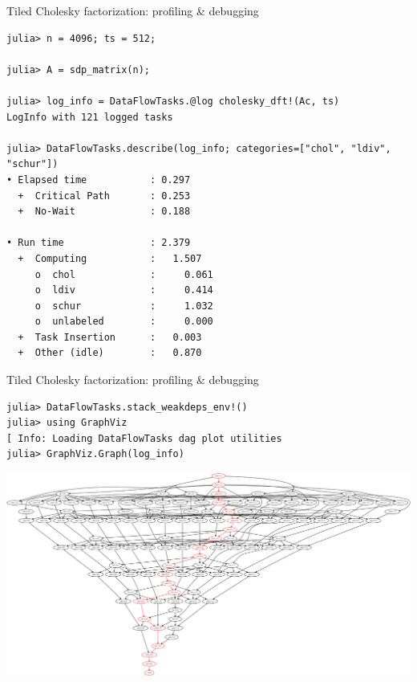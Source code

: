 \documentclass{beamer}
\begin{document}
\begin{frame}[fragile]{Tiled Cholesky factorization: profiling \& debugging}
  \begin{verbatim}
julia> n = 4096; ts = 512;
    
julia> A = sdp_matrix(n);
    
julia> log_info = DataFlowTasks.@log cholesky_dft!(Ac, ts)
LogInfo with 121 logged tasks

julia> DataFlowTasks.describe(log_info; categories=["chol", "ldiv", "schur"])
• Elapsed time           : 0.297
  +  Critical Path       : 0.253
  +  No-Wait             : 0.188

• Run time               : 2.379
  +  Computing           :   1.507
     o  chol             :     0.061
     o  ldiv             :     0.414
     o  schur            :     1.032
     o  unlabeled        :     0.000
  +  Task Insertion      :   0.003
  +  Other (idle)        :   0.870
\end{verbatim}
\end{frame}

\begin{frame}[fragile]{Tiled Cholesky factorization: profiling \& debugging}
\begin{verbatim}
julia> DataFlowTasks.stack_weakdeps_env!()
julia> using GraphViz
[ Info: Loading DataFlowTasks dag plot utilities
julia> GraphViz.Graph(log_info)
\end{verbatim}
\includegraphics[width=\textwidth]{Cholesky_dag.png}
\end{frame}
\end{document}
